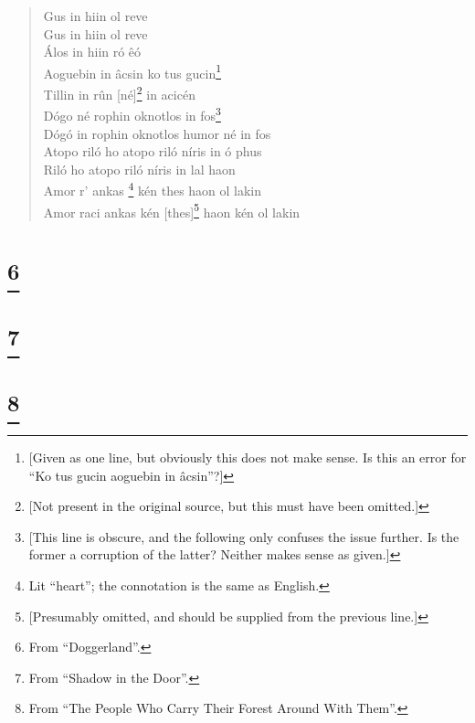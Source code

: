 \documentclass{article}
\let\oldthefootnote\thefootnote
\newcommand\oocfootnote[2][DarkGreen]{\renewcommand\thefootnote{\color{#1}\oldthefootnote}%
  \footnote{\color{#1}#2}%
  \renewcommand{\thefootnote}{\oldthefootnote}}
\begin{document}
\begin{verse}
Gus in hiin ol reve \\
Gus in hiin ol reve \\
Álos in hiin ró êó \\
Aoguebin in âcsin ko tus gucin\footnote{[Given as one line, but obviously this does not make sense. Is this an error for ``Ko tus gucin aoguebin in âcsin''?]} \\
Tillin in rûn [né]\footnote{[Not present in the original source, but this must have been omitted.]} in acicén \\
Dógo né rophin oknotlos in fos\footnote{[This line is obscure, and the following only confuses the issue further. Is the former a corruption of the latter? Neither makes sense as given.]} \\
Dógó in rophin oknotlos humor né in fos \\

Atopo riló ho atopo riló níris in ó phus \\
Riló ho atopo riló níris in lal haon \\
Amor r' ankas\oocfootnote{Lit ``heart''; the connotation is the same as English.} kén thes haon ol lakin \\
Amor raci ankas kén [thes]\footnote{[Presumably omitted, and should be supplied from the previous line.]} haon kén ol lakin \\


\end{verse}

\section{\oocfootnote{From ``Doggerland''.}}


\begin{verse}
\end{verse}


\section{\oocfootnote{From ``Shadow in the Door''.}}


\begin{verse}
\end{verse}


\section{\oocfootnote{From ``The People Who Carry Their Forest Around With Them''.}}
\end{document}
